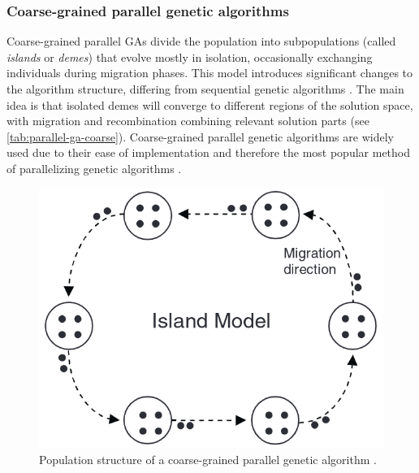 \documentclass[sigconf]{acmart}
\begin{document}
\subsubsection*{Coarse-grained parallel genetic algorithms}
Coarse-grained parallel GAs divide the population into subpopulations
(called \textit{islands} or \textit{demes}) that evolve mostly in isolation,
occasionally exchanging individuals during migration phases.
This model introduces significant changes to the algorithm structure,
differing from sequential genetic algorithms \cite{Affenzeller2009}.
The main idea is that isolated demes will converge to different regions of the
solution space, with migration and recombination combining relevant solution
parts (see \autoref{tab:parallel-ga-coarse})\cite{Affenzeller2009}.
Coarse-grained parallel genetic algorithms are widely used due to their
ease of implementation and therefore the most popular method of
parallelizing genetic algorithms \cite{Affenzeller2009}.
\begin{figure}[h]
  \includegraphics[scale=0.24]{assets/parallel-ga-coarse.png}
  \caption{
    Population structure of a coarse-grained parallel genetic algorithm
    \cite{Affenzeller2009}.
  }
  \label{tab:parallel-ga-coarse}
\end{figure}
\end{document}
